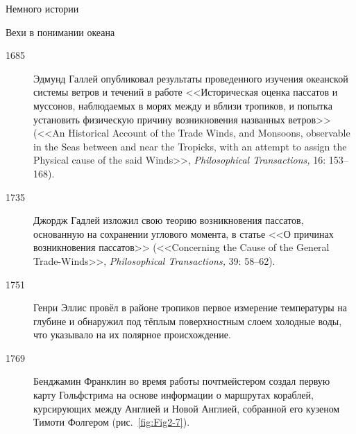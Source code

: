 \begin{chapter}{Немного истории}
\begin{section}{Вехи в понимании океана}
\begin{description}
\item[1685] Эдмунд Галлей опубликовал результаты проведенного
изучения океанской системы ветров и течений в работе <<Историческая оценка 
пассатов и муссонов, наблюдаемых в морях между и вблизи тропиков, 
и попытка установить физическую причину возникновения
названных ветров>> (<<An Historical Account of the Trade Winds, and
Monsoons, observable in the Seas between and near the Tropicks, with
an attempt to assign the Physical cause of the said Winds>>, 
\textsl{Philosophical Transactions,} 16: 153--168).
%

\item[1735] Джордж Гадлей изложил свою теорию возникновения
пассатов, основанную на сохранении углового момента, в статье
<<О причинах возникновения пассатов>> (<<Concerning the Cause of
the General Trade-Winds>>, \textsl{Philosophical Transactions,} 39: 58--62).
%


\item[1751] Генри Эллис провёл в районе тропиков первое
измерение температуры на глубине и обнаружил под тёплым поверхностным
слоем холодные воды, что указывало на их полярное происхождение.
%

\item[1769] Бенджамин Франклин во время работы почтмейстером 
создал первую карту Гольфстрима на основе информации о маршрутах кораблей, 
курсирующих между Англией и Новой Англией, собранной его кузеном 
Тимоти Фолгером (рис.~\ref{fig:Fig2-7}).
%


\end{description}
\end{section}
\end{chapter}
